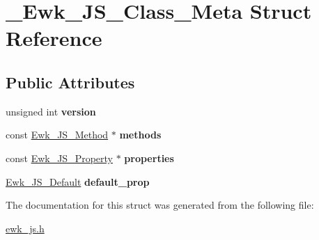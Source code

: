 \hypertarget{struct__Ewk__JS__Class__Meta}{\section{\+\_\+\+Ewk\+\_\+\+J\+S\+\_\+\+Class\+\_\+\+Meta Struct Reference}
\label{struct__Ewk__JS__Class__Meta}
}
\subsection*{Public Attributes}
\begin{DoxyCompactItemize}
\item 
\hypertarget{struct__Ewk__JS__Class__Meta_a55f3ca1ed6ee402f46ff164d4b0b5519}{unsigned int {\bfseries version}}\label{struct__Ewk__JS__Class__Meta_a55f3ca1ed6ee402f46ff164d4b0b5519}

\item 
\hypertarget{struct__Ewk__JS__Class__Meta_a805031b6a5c43769be7617f74221a928}{const \hyperlink{struct__Ewk__JS__Method}{Ewk\+\_\+\+J\+S\+\_\+\+Method} $\ast$ {\bfseries methods}}\label{struct__Ewk__JS__Class__Meta_a805031b6a5c43769be7617f74221a928}

\item 
\hypertarget{struct__Ewk__JS__Class__Meta_a3312e33d483ed643cb07541d95a01db9}{const \hyperlink{struct__Ewk__JS__Property}{Ewk\+\_\+\+J\+S\+\_\+\+Property} $\ast$ {\bfseries properties}}\label{struct__Ewk__JS__Class__Meta_a3312e33d483ed643cb07541d95a01db9}

\item 
\hypertarget{struct__Ewk__JS__Class__Meta_a54ad6a569e20c752fbdcfe9df35ba09b}{\hyperlink{struct__Ewk__JS__Default}{Ewk\+\_\+\+J\+S\+\_\+\+Default} {\bfseries default\+\_\+prop}}\label{struct__Ewk__JS__Class__Meta_a54ad6a569e20c752fbdcfe9df35ba09b}

\end{DoxyCompactItemize}


The documentation for this struct was generated from the following file\+:\begin{DoxyCompactItemize}
\item 
\hyperlink{ewk__js_8h}{ewk\+\_\+js.\+h}\end{DoxyCompactItemize}
